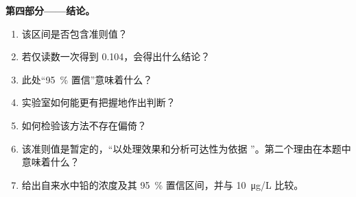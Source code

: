 \begin{problem}
\medskip
\noindent\textbf{第四部分——结论。}
\begin{enumerate}[resume]
  \item 该区间是否包含准则值？
  \item 若仅读数一次得到 0.104，会得出什么结论？
  \item 此处“95~\% 置信”意味着什么？
  \item 实验室如何能更有把握地作出判断？
  \item 如何检验该方法不存在偏倚？
  \item 该准则值是暂定的，“以处理效果和分析可达性为依据
        ”。第二个理由在本题中意味着什么？
  \item 给出自来水中铅的浓度及其 95~\% 置信区间，并与
        \qty{10}{\micro g/L} 比较。
\end{enumerate}
\end{problem}

